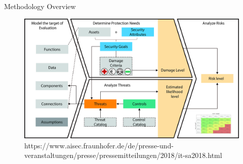 \documentclass[xcolor=table]{beamer}
\begin{document}
\begin{frame}{Methodology Overview}
 \begin{figure}[H]
  \includegraphics[width=0.9\linewidth]{img/mora-method.jpg}
  \label{fig:mora_overview}
  https://www.aisec.fraunhofer.de/de/presse-und-veranstaltungen/presse/pressemitteilungen/2018/it-sa2018.html
\end{figure}
\end{frame}

\end{document}
